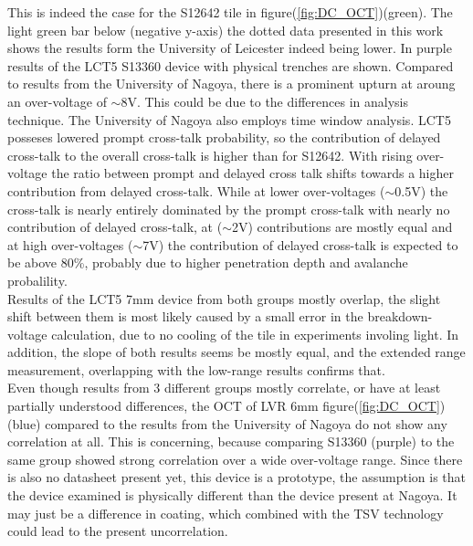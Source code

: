 \documentclass[12pt,article,type=msc,colorback,accentcolor=tud9c]{tudthesis}
\begin{document}
This is indeed the case for the S12642 tile in figure(\ref{fig:DC_OCT})(green). The light green bar below (negative y-axis) the dotted data presented in this work shows the results form the University of Leicester indeed being lower. In purple results of the LCT5 S13360 device with physical trenches are shown. Compared to results from the University of Nagoya, there is a prominent upturn at aroung an over-voltage of $\sim$8V. This could be due to the differences in analysis technique. The University of Nagoya also employs time window analysis. LCT5 posseses lowered prompt cross-talk probability, so the contribution of delayed cross-talk to the overall cross-talk is higher than for S12642. With rising over-voltage the ratio between prompt and delayed cross talk shifts towards a higher contribution from delayed cross-talk\cite{DelayedOCT}\cite{Yamamoto}. While at lower over-voltages ($\sim$0.5V) the cross-talk is nearly entirely dominated by the prompt cross-talk with nearly no contribution of delayed cross-talk, at ($\sim$2V) contributions are mostly equal and at high over-voltages ($\sim$7V) the contribution of delayed cross-talk is expected to be above 80\%, probably due to higher penetration depth and avalanche probalility.\\
Results of the LCT5 7mm device from both groups mostly overlap, the slight shift between them is most likely caused by a small error in the breakdown-voltage calculation, due to no cooling of the tile in experiments involing light. In addition, the slope of both results seems be mostly equal, and the extended range measurement, overlapping with the low-range results confirms that.\\
Even though results from 3 different groups mostly correlate, or have at least partially understood differences, the OCT of LVR 6mm figure(\ref{fig:DC_OCT})(blue) compared to the results from the University of Nagoya do not show any correlation at all. This is concerning, because comparing S13360 (purple) to the same group showed strong correlation over a wide over-voltage range. Since there is also no datasheet present yet, this device is a prototype, the assumption is that the device examined is physically different than the device present at Nagoya. It may just be a difference in coating, which combined with the TSV technology could lead to the present uncorrelation\cite{Yamamoto}.






\end{document}
